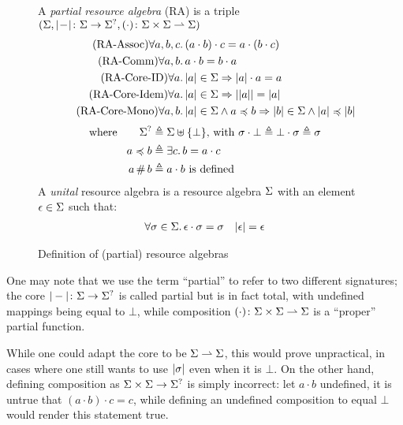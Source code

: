 \begin{figure}
A \emph{partial resource algebra} (RA) is a triple $(\Sigma, |\!-\!|\colon \Sigma\rightarrow \Sigma^?, (\cdot)\colon \Sigma\times \Sigma \rightharpoonup \Sigma)$
\begin{align}
	\tag{RA-Assoc} \forall a,b,c&\ldotp (a\cdot b)\cdot c = a\cdot (b\cdot c)\\
	\tag{RA-Comm} \forall a,b&\ldotp a\cdot b = b\cdot a\\
	\tag{RA-Core-ID} \forall a&\ldotp |a| \in \Sigma \Rightarrow |a|\cdot a = a\\
	\tag{RA-Core-Idem} \forall a&\ldotp |a|\in \Sigma\Rightarrow ||a|| = |a|\\
	\tag{RA-Core-Mono} \forall a,b&\ldotp |a|\in \Sigma\land a\preccurlyeq b \Rightarrow |b| \in \Sigma \land |a| \preccurlyeq |b|
\end{align}
\begin{align*}
	\text{where}\qquad
	\Sigma^? &\triangleq \Sigma \uplus \{\bot\}\text{, with }\sigma\cdot \bot \triangleq \bot\cdot \sigma\triangleq \sigma\\
	a \preccurlyeq b &\triangleq \exists c\ldotp b = a\cdot c\\
	a\operatorname{\#} b &\triangleq a \cdot b \text{ is defined}
\end{align*}
A \emph{unital} resource algebra is a resource algebra $\Sigma$ with an element $\epsilon\in \Sigma$ such that:
\begin{align*}
	\forall \sigma\in \Sigma\ldotp \epsilon\cdot \sigma = \sigma&&
	|\epsilon|=\epsilon
\end{align*}
\caption{Definition of (partial) resource algebras}
\label{fig:ra-properties}
\end{figure}

\begin{remark}
	One may note that we use the term ``partial'' to refer to two different signatures; the core $|-|\colon \Sigma \rightarrow \Sigma^?$ is called partial but is in fact total, with undefined mappings being equal to $\bot$, while composition $(\cdot)\colon \Sigma\times \Sigma\rightharpoonup \Sigma$ is a ``proper'' partial function.

	While one could adapt the core to be $\Sigma\rightharpoonup \Sigma$, this would prove unpractical, in cases where one still wants to use $|\sigma|$ even when it is $\bot$. On the other hand, defining composition as $\Sigma\times \Sigma\rightarrow \Sigma^?$ is simply incorrect: let $a\cdot b$ undefined, it is untrue that $(a\cdot b)\cdot c=c$, while defining an undefined composition to equal $\bot$ would render this statement true.
\end{remark}

